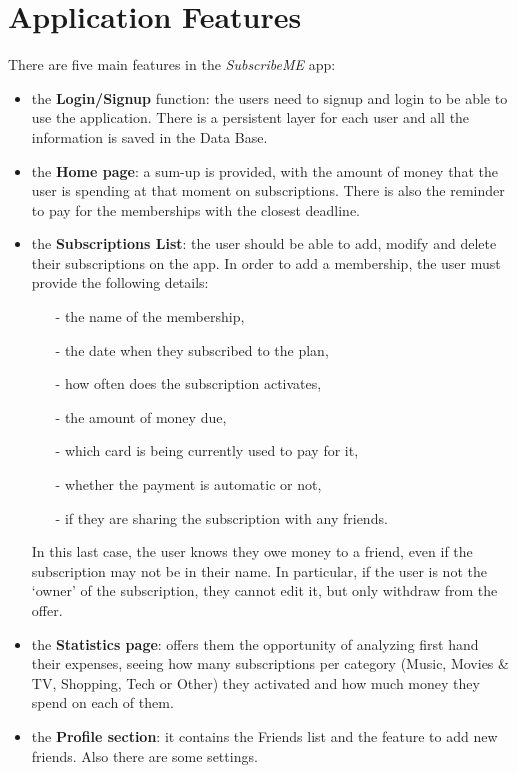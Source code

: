 \documentclass[12pt]{article}
\begin{document}
\section{Application Features}\label{sec:features}
There are five main features in the \textit{SubscribeME} app:
\begin{itemize}
    \item the \textbf{Login/Signup} function: the users need to signup and login to be able to use the application. There is a persistent layer for each user and all the information is saved in the Data Base.
    \item the \textbf{Home page}: a sum-up is provided, with the amount of money that the user is spending at that moment on subscriptions. There is also the reminder to pay for the memberships with the closest deadline.
    \item the \textbf{Subscriptions List}: the user should be able to add, modify and delete their subscriptions on the app.
          In order to add a membership, the user must provide the following details:
          \begin{itemize}
              \item[-] the name of the membership,
              \item[-] the date when they subscribed to the plan,
              \item[-] how often does the subscription activates,
              \item[-] the amount of money due,
              \item[-] which card is being currently used to pay for it,
              \item[-] whether the payment is automatic or not,
              \item[-] if they are sharing the subscription with any friends.
          \end{itemize}
          In this last case, the user knows they owe money to a friend, even if the subscription may not be in their name. In particular, if the user is not the `owner' of the subscription, they cannot edit it, but only withdraw from the offer.
    \item the \textbf{Statistics page}: offers them the opportunity of analyzing first hand their expenses, seeing how many subscriptions per category (Music, Movies \& TV, Shopping, Tech or Other) they activated and how much money they spend on each of them.
    \item the \textbf{Profile section}: it contains the Friends list and the feature to add new friends. Also there are some settings.
\end{itemize}
\end{document}
